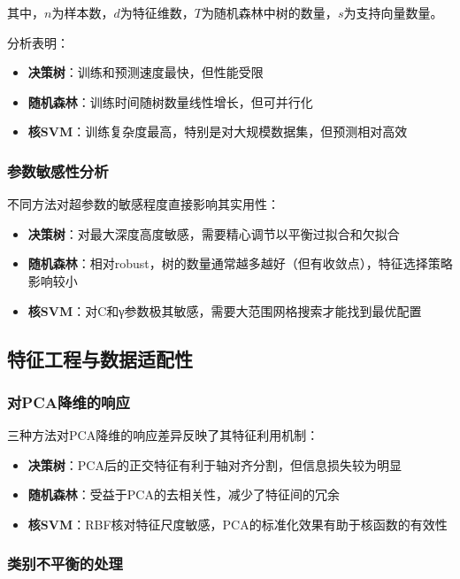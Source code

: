 \documentclass[UTF8]{report}
\theoremstyle{MyLineTheoremStyle} %
\theoremstyle{MyBlockTheoremStyle} %
\theoremstyle{MySubsubsectionStyle} %
\begin{document}
其中，$n$为样本数，$d$为特征维数，$T$为随机森林中树的数量，$s$为支持向量数量。

分析表明：
\begin{itemize}
    \item \textbf{决策树}：训练和预测速度最快，但性能受限
    \item \textbf{随机森林}：训练时间随树数量线性增长，但可并行化
    \item \textbf{核SVM}：训练复杂度最高，特别是对大规模数据集，但预测相对高效
\end{itemize}

\subsubsection{参数敏感性分析}

不同方法对超参数的敏感程度直接影响其实用性：

\begin{itemize}
    \item \textbf{决策树}：对最大深度高度敏感，需要精心调节以平衡过拟合和欠拟合
    \item \textbf{随机森林}：相对robust，树的数量通常越多越好（但有收敛点），特征选择策略影响较小
    \item \textbf{核SVM}：对C和γ参数极其敏感，需要大范围网格搜索才能找到最优配置
\end{itemize}

\subsection{特征工程与数据适配性}

\subsubsection{对PCA降维的响应}

三种方法对PCA降维的响应差异反映了其特征利用机制：

\begin{itemize}
    \item \textbf{决策树}：PCA后的正交特征有利于轴对齐分割，但信息损失较为明显
    \item \textbf{随机森林}：受益于PCA的去相关性，减少了特征间的冗余
    \item \textbf{核SVM}：RBF核对特征尺度敏感，PCA的标准化效果有助于核函数的有效性
\end{itemize}

\subsubsection{类别不平衡的处理}
\end{document}

